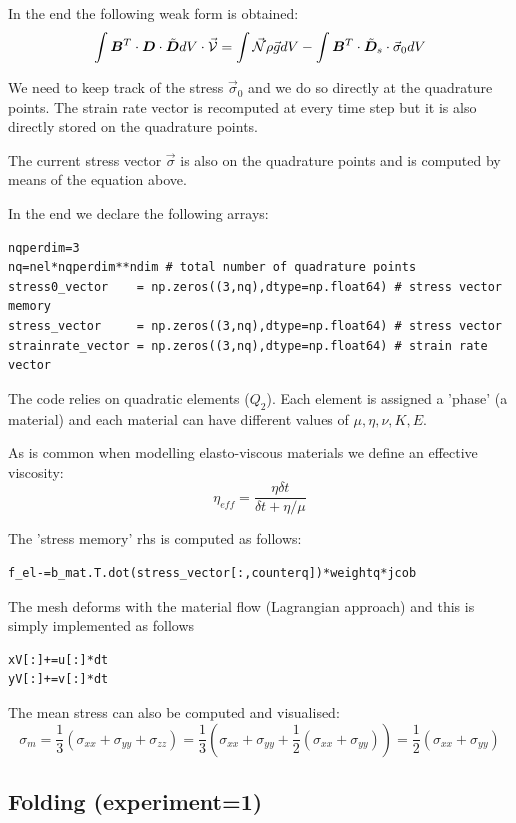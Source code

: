 In the end the following weak form is obtained:
\[
\int {\bm B}^T \cdot {\bm D} \cdot \tilde{\bm D} dV \cdot \vec{\cal V} 
= \int \vec{{\mathcal{N}}} \rho \vec{g} dV -\int {\bm B}^T \cdot \tilde{\bm D}_s \cdot \vec{\sigma}_0 dV
\]

We need to keep track of the stress $\vec{\sigma}_0$ and 
we do so directly at the quadrature points.
The strain rate vector is recomputed at every time step but it is also 
directly stored on the quadrature points.

The current stress vector $\vec{\sigma}$ is also on the quadrature points and
is computed by means of the equation above.

In the end we declare the following arrays:
\begin{lstlisting}
nqperdim=3
nq=nel*nqperdim**ndim # total number of quadrature points
stress0_vector    = np.zeros((3,nq),dtype=np.float64) # stress vector memory
stress_vector     = np.zeros((3,nq),dtype=np.float64) # stress vector 
strainrate_vector = np.zeros((3,nq),dtype=np.float64) # strain rate vector
\end{lstlisting}

The code relies on quadratic elements ($Q_2$).
Each element is assigned a 'phase' (a material) and 
each material can have different values of $\mu, \eta, \nu, K, E$.

As is common when modelling elasto-viscous materials
we define an effective viscosity:
\[
\eta_{eff} 
= \frac{\eta \delta t}{\delta t + \eta/\mu} 
\]

The 'stress memory' rhs is computed as follows:
\begin{lstlisting}
f_el-=b_mat.T.dot(stress_vector[:,counterq])*weightq*jcob
\end{lstlisting}



The mesh deforms with the material flow (Lagrangian approach)
and this is simply implemented as follows 

\begin{lstlisting}
xV[:]+=u[:]*dt
yV[:]+=v[:]*dt
\end{lstlisting}

The mean stress can also be computed and visualised:
\[
\sigma_m 
= \frac{1}{3}(\sigma_{xx}+\sigma_{yy}+\sigma_{zz})
= \frac{1}{3}(\sigma_{xx}+\sigma_{yy}+\frac12(\sigma_{xx}+\sigma_{yy}))
= \frac{1}{2}(\sigma_{xx}+\sigma_{yy})
\]


\subsection*{Folding (experiment=1)}


